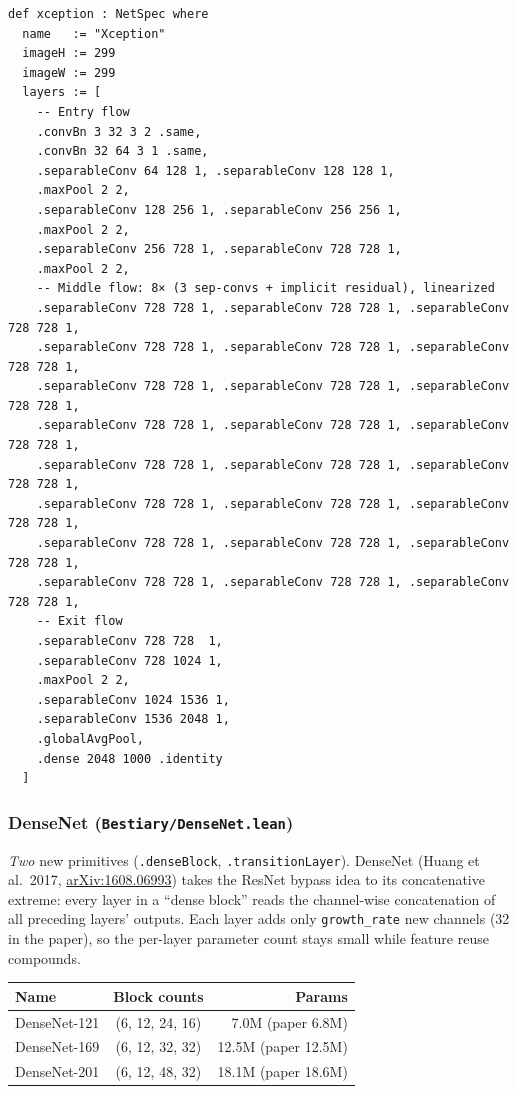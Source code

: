 \begin{verbatim}
def xception : NetSpec where
  name   := "Xception"
  imageH := 299
  imageW := 299
  layers := [
    -- Entry flow
    .convBn 3 32 3 2 .same,
    .convBn 32 64 3 1 .same,
    .separableConv 64 128 1, .separableConv 128 128 1,
    .maxPool 2 2,
    .separableConv 128 256 1, .separableConv 256 256 1,
    .maxPool 2 2,
    .separableConv 256 728 1, .separableConv 728 728 1,
    .maxPool 2 2,
    -- Middle flow: 8× (3 sep-convs + implicit residual), linearized
    .separableConv 728 728 1, .separableConv 728 728 1, .separableConv 728 728 1,
    .separableConv 728 728 1, .separableConv 728 728 1, .separableConv 728 728 1,
    .separableConv 728 728 1, .separableConv 728 728 1, .separableConv 728 728 1,
    .separableConv 728 728 1, .separableConv 728 728 1, .separableConv 728 728 1,
    .separableConv 728 728 1, .separableConv 728 728 1, .separableConv 728 728 1,
    .separableConv 728 728 1, .separableConv 728 728 1, .separableConv 728 728 1,
    .separableConv 728 728 1, .separableConv 728 728 1, .separableConv 728 728 1,
    .separableConv 728 728 1, .separableConv 728 728 1, .separableConv 728 728 1,
    -- Exit flow
    .separableConv 728 728  1,
    .separableConv 728 1024 1,
    .maxPool 2 2,
    .separableConv 1024 1536 1,
    .separableConv 1536 2048 1,
    .globalAvgPool,
    .dense 2048 1000 .identity
  ]
\end{verbatim}

\subsubsection*{DenseNet (\texttt{Bestiary/DenseNet.lean})}
\emph{Two} new primitives (\texttt{.denseBlock}, \texttt{.transitionLayer}).
DenseNet (Huang et al.\ 2017,
\href{https://arxiv.org/abs/1608.06993}{arXiv:1608.06993}) takes the
ResNet bypass idea to its concatenative extreme: every layer in a
``dense block'' reads the channel-wise concatenation of all preceding
layers' outputs. Each layer adds only \texttt{growth\_rate} new
channels (32 in the paper), so the per-layer parameter count stays
small while feature reuse compounds.

\begin{center}
\begin{tabular}{l c r}
\hline
Name          & Block counts        & Params              \\
\hline
DenseNet-121  & (6, 12, 24, 16)     &  7.0M (paper 6.8M)  \\
DenseNet-169  & (6, 12, 32, 32)     & 12.5M (paper 12.5M) \\
DenseNet-201  & (6, 12, 48, 32)     & 18.1M (paper 18.6M) \\
\hline
\end{tabular}
\end{center}

